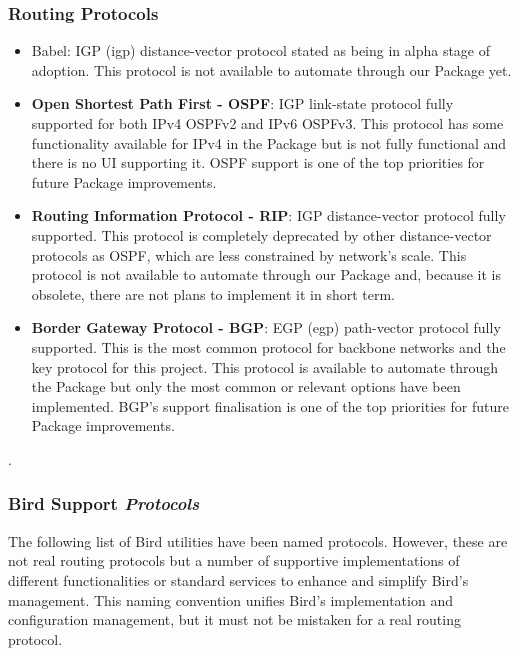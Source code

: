 \subsubsection{Routing Protocols}
\begin{itemize}
    \item Babel: IGP (\Gls{igp}) distance-vector protocol stated as being in alpha stage of adoption.
    This protocol is not available to automate through our Package yet.
    \item \textbf{Open Shortest Path First - OSPF}: IGP link-state protocol fully supported for both IPv4 OSPFv2 and IPv6 OSPFv3.
    This protocol has some functionality available for IPv4 in the Package but is not fully functional and there is no UI supporting it. OSPF support is one of the top priorities for future Package improvements.
    \item \textbf{Routing Information Protocol - RIP}: IGP distance-vector protocol fully supported. This protocol is completely deprecated by other distance-vector protocols as OSPF, which are less constrained by network's scale.
    This protocol is not available to automate through our Package and, because it is obsolete, there are not plans to implement it in short term.
    \item \textbf{Border Gateway Protocol - BGP}: EGP (\Gls{egp}) path-vector protocol fully supported. This is the most common protocol for backbone networks and the key protocol for this project.
    This protocol is available to automate through the Package but only the most common or relevant options have been implemented. BGP's support finalisation is one of the top priorities for future Package improvements. 
\end{itemize}.

\subsubsection{Bird Support \textit{Protocols}}
\label{sub:sub:supproto}
The following list of Bird utilities have been named protocols. However, these are not real routing protocols but a number of supportive implementations of different functionalities or standard services to enhance and simplify Bird's management. This naming convention unifies Bird's implementation and configuration management, but it must not be mistaken for a real routing protocol.

